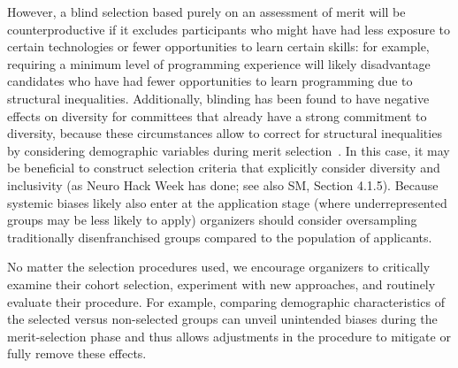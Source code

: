 However, a blind selection based purely on an assessment of merit will be counterproductive if it excludes participants who might have had less exposure to certain technologies or fewer opportunities to learn certain skills: for example, requiring a minimum level of programming experience will likely disadvantage candidates who have had fewer opportunities to learn programming due to structural inequalities.
Additionally, blinding has been found to have negative effects on diversity for committees that  already have a strong commitment to diversity, because these circumstances allow to correct for structural inequalities by considering demographic variables during merit selection~\cite{behaghel2015unintended}.
In this case, it may be beneficial to construct selection criteria that explicitly consider diversity and inclusivity (as Neuro Hack Week has done; see also SM, Section 4.1.5).
Because systemic biases likely also enter at the application stage (where underrepresented groups may be less likely to apply) organizers should consider oversampling traditionally disenfranchised groups compared to the population of applicants.

No matter the selection procedures used, we encourage organizers to critically examine their cohort selection, experiment with new approaches, and routinely evaluate their procedure. For example, comparing demographic characteristics of the selected versus non-selected groups can unveil unintended biases during the merit-selection phase and thus allows adjustments in the procedure to mitigate or fully remove these effects.

